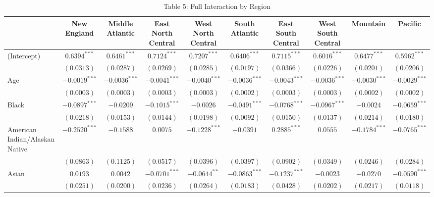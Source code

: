 \documentclass{article}
\begin{document}
\begin{table}
\begin{center}
\caption*{Table 5: Full Interaction by Region} 
\begin{tabular}{l c c c c c c c c c}
\hline
 & New England & Middle Atlantic & East North Central & West North Central & South Atlantic & East South Central & West South Central & Mountain & Pacific \\
\hline
(Intercept)                    & $0.6394^{***}$  & $0.6461^{***}$  & $0.7124^{***}$  & $0.7207^{***}$  & $0.6406^{***}$  & $0.7115^{***}$  & $0.6016^{***}$  & $0.6477^{***}$  & $0.5962^{***}$  \\
                               & $(0.0313)$      & $(0.0287)$      & $(0.0269)$      & $(0.0285)$      & $(0.0197)$      & $(0.0366)$      & $(0.0226)$      & $(0.0201)$      & $(0.0206)$      \\
Age                            & $-0.0019^{***}$ & $-0.0036^{***}$ & $-0.0041^{***}$ & $-0.0040^{***}$ & $-0.0036^{***}$ & $-0.0043^{***}$ & $-0.0036^{***}$ & $-0.0030^{***}$ & $-0.0029^{***}$ \\
                               & $(0.0003)$      & $(0.0003)$      & $(0.0003)$      & $(0.0003)$      & $(0.0002)$      & $(0.0003)$      & $(0.0003)$      & $(0.0002)$      & $(0.0002)$      \\
Black                          & $-0.0897^{***}$ & $-0.0209$       & $-0.1015^{***}$ & $-0.0026$       & $-0.0491^{***}$ & $-0.0768^{***}$ & $-0.0967^{***}$ & $-0.0024$       & $-0.0659^{***}$ \\
                               & $(0.0218)$      & $(0.0153)$      & $(0.0144)$      & $(0.0198)$      & $(0.0092)$      & $(0.0150)$      & $(0.0137)$      & $(0.0214)$      & $(0.0180)$      \\
American Indian/Alaskan Native & $-0.2520^{***}$ & $-0.1588$       & $0.0075$        & $-0.1228^{***}$ & $-0.0391$       & $0.2885^{***}$  & $0.0555$        & $-0.1784^{***}$ & $-0.0765^{***}$ \\
                               & $(0.0863)$      & $(0.1125)$      & $(0.0517)$      & $(0.0396)$      & $(0.0397)$      & $(0.0902)$      & $(0.0349)$      & $(0.0246)$      & $(0.0284)$      \\
Asian                          & $0.0193$        & $0.0042$        & $-0.0701^{***}$ & $-0.0644^{**}$  & $-0.0863^{***}$ & $-0.1237^{***}$ & $-0.0023$       & $-0.0270$       & $-0.0590^{***}$ \\
                               & $(0.0251)$      & $(0.0200)$      & $(0.0236)$      & $(0.0264)$      & $(0.0183)$      & $(0.0428)$      & $(0.0202)$      & $(0.0217)$      & $(0.0118)$      \\

\end{tabular}
\end{center}
\end{table}
\end{document}
